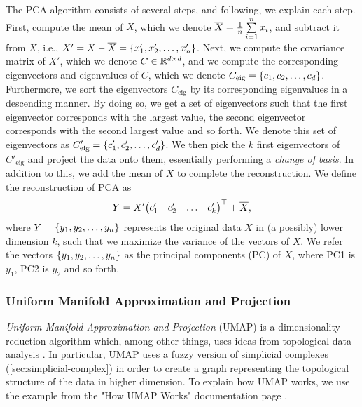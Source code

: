 The PCA algorithm consists of several steps, and following, we explain each step. First, compute the mean of $X$, which we denote $\overline{X} = \frac{1}{n} \sum\limits_{i=1}^{n} x_i$, and subtract it from $X$, i.e., $X' = X - \overline{X} = \left\{x'_1, x'_2, \ldots, x'_n\right\}$. Next, we compute the covariance matrix of $X'$, which we denote $C \in \mathbb{R}^{d \times d}$, and we compute the corresponding eigenvectors and eigenvalues of $C$, which we denote $C_\text{eig} = \left\{c_1, c_2, \ldots, c_d\right\}$. Furthermore, we sort the eigenvectors $C_\text{eig}$ by its corresponding eigenvalues in a descending manner. By doing so, we get a set of eigenvectors such that the first eigenvector corresponds with the largest value, the second eigenvector corresponds with the second largest value and so forth. We denote this set of eigenvectors as $C'_\text{eig} = \left\{c'_1, c'_2, \ldots, c'_d\right\}$. We then pick the $k$ first eigenvectors of $C'_\text{eig}$ and project the data onto them, essentially performing a \textit{change of basis}. In addition to this, we add the mean of $X$ to complete the reconstruction. We define the reconstruction of PCA as
\begin{align}
    Y = X' {\begin{pmatrix}
    c'_1 & c'_2 & \ldots & c'_k
    \end{pmatrix}}^\top + \overline{X},
    \label{eqn:pca-projection}
\end{align}
where $Y = \left\{y_1, y_2, \ldots, y_n\right\}$ represents the original data $X$ in (a possibly) lower dimension $k$, such that we maximize the variance of the vectors of $X$. We refer the vectors $\left\{y_1, y_2, \ldots, y_n\right\}$ as the principal components (PC) of $X$, where PC1 is $y_1$, PC2 is $y_2$ and so forth.

\subsubsection{Uniform Manifold Approximation and Projection}
\label{sec:umap}
\textit{Uniform Manifold Approximation and Projection} (UMAP) is a dimensionality reduction algorithm which, among other things, uses ideas from topological data analysis \cite{2018arXivUMAP}. In particular, UMAP uses a fuzzy version of simplicial complexes (\cref{sec:simplicial-complex}) in order to create a graph representing the topological structure of the data in higher dimension. To explain how UMAP works, we use the example from the "How UMAP Works" documentation page \cite{how-umap-works-2018}.

